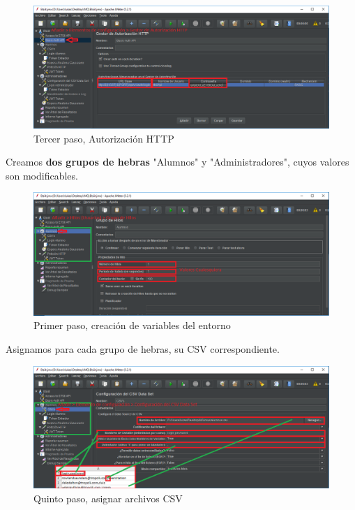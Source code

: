\documentclass[12pt,a4paper]{article}
\begin{document}
	\newpage

	\begin{figure}[h]
		\centering
		\includegraphics[width=1.0\textwidth]{images/step-3.png}
		\caption{Tercer paso, Autorización HTTP}
	\end{figure}
	Creamos \textbf{dos grupos de hebras} "Alumnos" y "Administradores", cuyos valores son modificables.

	\begin{figure}[h]
		\centering
		\includegraphics[width=1.0\textwidth]{images/step-4.png}
		\caption{Primer paso, creación de variables del entorno}
	\end{figure}
	
	\newpage
	Asignamos para cada grupo de hebras, su CSV correspondiente.
	\begin{figure}[h]
		\centering
		\includegraphics[width=1.0\textwidth]{images/step-5.png}
		\caption{Quinto paso, asignar archivos CSV}
	\end{figure}
\end{document}
